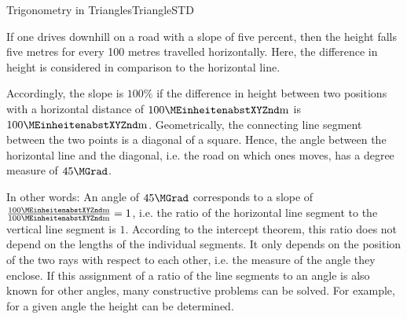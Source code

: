 \begin{MXContent}{Trigonometry in Triangles}{Triangle}{STD}

If one drives downhill on a road with a slope of five percent, then
the height falls five metres for every 100 metres travelled horizontally. Here, the difference in height
is considered in comparison to the horizontal line.

\begin{center}
\end{center}

Accordingly, the slope is $100\%$ if the difference in height 
between two positions with a horizontal distance of $100\MEinheit{m}$
is $100\MEinheit{m}$. Geometrically, the connecting line segment between 
the two points is a diagonal of a square. Hence, the angle between the horizontal 
line and the diagonal, i.e. the road on which ones moves, has a degree measure 
of $45\MGrad$.



\begin{center}
\end{center}

In other words: An angle of $45\MGrad$ corresponds to a slope of 
$\frac{100\MEinheit{m}}{100\MEinheit{m}} = 1$, i.e. the ratio 
of the horizontal line segment to the vertical line segment is $1$. 
According to the intercept theorem, this ratio does not depend 
on the lengths of the individual segments. It only depends on 
the position of the two rays with respect to each other, i.e. 
the measure of the angle they enclose. If this assignment of a 
ratio of the line segments to an angle is also known for other angles, many constructive 
problems can be solved. For example, for a given angle the height can be
determined. 


\end{MXContent}
